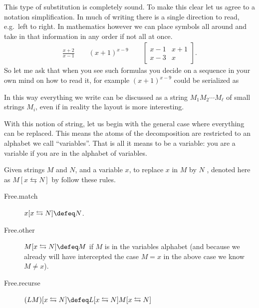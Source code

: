 This type of substitution is completely sound.  To make this clear let us agree 
to a notation simplification.  In much of writing there is a single direction 
to read, e.g.\ left to right.  In mathematics however we can place symbols 
all around and take in that information in any order if not all at once.
\begin{align*}
    \frac{x+2}{x-1} \qquad (x+1)^{x-9} \qquad \begin{bmatrix} x-1 & x+1\\ x-3 & x \end{bmatrix}.
\end{align*}
So let me ask that when you see such formulas you decide on a sequence in your own mind 
on how to 
read it, for example $(x+1)^{x-9}$ could be serialized as 
\begin{center}
\end{center}
In this way everything we write can be discussed as a string $M_1 M_2\cdots M_{\ell}$
of small strings $M_i$, even if in reality the layout is more interesting.

With this notion of string, let us begin with the general case where everything 
can be replaced.  This means the atoms of the decomposition are restricted to an
alphabet we call ``variables''. That is all it means to be a variable: you are a
variable if you are in the alphabet of variables.  

\begin{definition}
    Given strings $M$ and $N$, and a variable $x$, to replace $x$ in $M$ by $N$ ,
    denoted here as $M[x\leftrightarrows N]$ by follow these rules.
    \begin{description}
        \item[Free.match] $x[x\leftrightarrows N]\defeq N$.
        \item[Free.other] $M[x\leftrightarrows N]\defeq M$ if $M$ is in the variables alphabet (and 
        because we already will have intercepted the case $M=x$ in the above case we know $M\neq x$).
        
        \item[Free.recurse] $(LM)[x\leftrightarrows N]\defeq L[x\leftrightarrows N]M[x\leftrightarrows N]$
    \end{description}
\end{definition}

